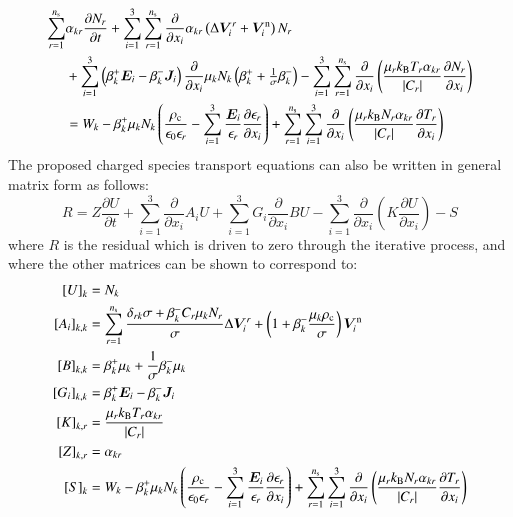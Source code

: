 \documentclass{warpdoc}
\newcommand{\alb}{\vspace{0.1cm}\\} %
\newcommand{\ns}{{n_{\rm s}}}
\renewcommand{\vec}[1]{\bm{#1}}
\begin{document}
\begin{align}
  \sum_{r=1}^{\ns}& \alpha_{kr} \frac{\partial N_r}{\partial t}  
+ \sum_{i=1}^3 \sum_{r=1}^\ns  \frac{\partial}{\partial x_i}      \alpha_{kr} \left( \Delta \vec{V}_i^r + \vec{V}^{\rm n}_i \right)N_r\nonumber\alb
&+  \sum_{i=1}^3 \left( \beta_k^+ \vec{E}_i- \beta_k^- \vec{J}_i   \right) \frac{\partial}{\partial x_i}  \mu_{k} N_{k} \left( \beta_k^+ + {\textstyle \frac{1}{\sigma}} \beta_k^-  
\right) 
- \sum_{i=1}^3 \sum_{r=1}^{\ns} \frac{\partial}{\partial x_i} \left(\frac{\mu_r k_{\rm B} T_r \alpha_{kr}}{|C_r|}  \frac{\partial N_r}{\partial x_i}\right) \nonumber\alb
&= W_k
-\beta_k^+ \mu_{k} N_{k}\left(
  \frac{\rho_{\rm c}}{\epsilon_0\epsilon_r}
  -\sum_{i=1}^3 \frac{\vec{E}_i}{\epsilon_r} \frac{\partial \epsilon_r}{\partial x_i}  
\right)
+ \sum_{r=1}^\ns \sum_{i=1}^3  \frac{\partial}{\partial x_i} \left( \frac{\mu_r k_{\rm B} N_r  \alpha_{kr}}{|C_r|}   \frac{\partial T_r}{\partial x_i} \right)
\label{eqn:positivenegativespecies}
\end{align}
%
The proposed charged species transport equations can also be written in general matrix form as follows:
%
\begin{equation}
  R=Z\frac{\partial U}{\partial t} + \sum_{i=1}^3\frac{\partial}{\partial x_i} A_i U
    + \sum_{i=1}^3 G_i \frac{\partial}{\partial x_i} B U - \sum_{i=1}^3  \frac{\partial}{\partial x_i} \left( K \frac{\partial U}{\partial x_i} \right)-S
\label{eqn:Rproposed}
\end{equation}
%
where $R$ is the residual which is driven to zero through the iterative process, and where the other matrices can be shown to correspond to:
%
\begin{align}
 \left[U\right]_k&=N_k \alb
 \left[A_i\right]_{k,k}&=\sum_{r=1}^\ns \frac{\delta_{rk}\sigma+\beta_k^- C_r  \mu_k N_r}{\sigma} \Delta \vec{V}_i^r + \left(1+\beta_k^- \frac{\mu_k\rho_{\rm c}}{\sigma}\right)\vec{V}^{\rm n}_i \alb
 \left[B\right]_{k,k}&=\beta_k^+ \mu_k + \frac{1}{\sigma}\beta_k^- \mu_k \alb
 \left[G_i\right]_{k,k}&=\beta_k^+ \vec{E}_i - \beta_k^- \vec{J}_i \alb
 \left[K\right]_{k,r} &= \frac{\mu_r k_{\rm B} T_r \alpha_{kr}}{|C_r|} \alb
 \left[Z\right]_{k,r} &= \alpha_{kr} \alb
 \left[S\right]_k &= W_k 
-\beta_k^+ \mu_{k} N_{k}\left(
  \frac{\rho_{\rm c}}{\epsilon_0\epsilon_r}
  -\sum_{i=1}^3 \frac{\vec{E}_i}{\epsilon_r} \frac{\partial \epsilon_r}{\partial x_i}  
\right)
+ \sum_{r=1}^\ns \sum_{i=1}^3  \frac{\partial}{\partial x_i} \left( \frac{\mu_r k_{\rm B} N_r \alpha_{kr}}{|C_r|}  \frac{\partial T_r}{\partial x_i} \right)
\end{align}
\end{document}
